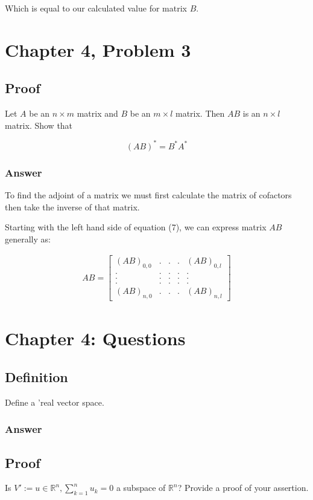\documentclass{article}
\begin{document}
		Which is equal to our calculated value for matrix $B$.
		
	\section{Chapter 4, Problem 3}
		\subsection{Proof}
		Let $A$ be an $n\times m$ matrix and $B$ be an $m\times l$ matrix.  Then $AB$ is an $n\times l$ matrix.  Show that 
		
		\begin{equation}
			(AB)^*=B^*A^*
		\end{equation}
		
		\subsubsection{Answer}
		
		To find the adjoint of a matrix we must first calculate the matrix of cofactors then take the inverse of that matrix.
		
		Starting with the left hand side of equation (7), we can express matrix $AB$ generally as:
		
		\begin{align*}AB =
			\begin{bmatrix}
			(AB)_{0,0}&.&.&.&(AB)_{0,l}\\
			.&.&.&.&.\\
			.&.&.&.&.\\
			.&.&.&.&.\\
			(AB)_{n,0}&.&.&.&(AB)_{n,l}
			\end{bmatrix}
		\end{align*}
		
	\section{Chapter 4: Questions}
		\subsection{Definition}
		Define a 'real vector space.
		
		\subsubsection{Answer}
		
		\subsection{Proof}
		Is $V':={u\in\mathbb{R}^{n},\sum_{k=1}^{n}u_{k}=0}$ a subspace of $\mathbb{R}^{n}$?  Provide a proof of your assertion.	
		
\end{document}
